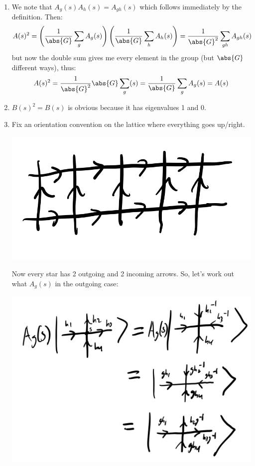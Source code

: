 \begin{enumerate}
    \item We note that $A_g(s)A_h(s) = A_{gh}(s)$ which follows immediately by the definition. Then:
    \begin{equation}
        A(s)^2 = \left(\frac{1}{\abs{G}}\sum_g A_g(s)\right)\left(\frac{1}{\abs{G}}\sum_h A_h(s)\right) = \frac{1}{\abs{G}^2}\sum_{gh}A_{gh}(s)
    \end{equation}
    but now the double sum gives me every element in the group (but $\abs{G}$ different ways), thus:
    \begin{equation}
        A(s)^2 = \frac{1}{\abs{G}^2} \abs{G}\sum_g(s) = \frac{1}{\abs{G}}\sum_gA_g(s) = A(s)
    \end{equation}
    \item $B(s)^2 = B(s)$ is obvious because it has eigenvalues 1 and 0.
    \item Fix an orientation convention on the lattice where everything goes up/right.
    
    \begin{center}
        \includegraphics[scale=0.35]{Lectures/Images/lec7-orientation.png}
    \end{center}
    
    Now every star has 2 outgoing and 2 incoming arrows. So, let's work out what $A_g(s)$ in the outgoing case:

    \begin{center}
        \includegraphics[scale=0.3]{Lectures/Images/lec7-Agreverse.png}
    \end{center}


\end{enumerate}
